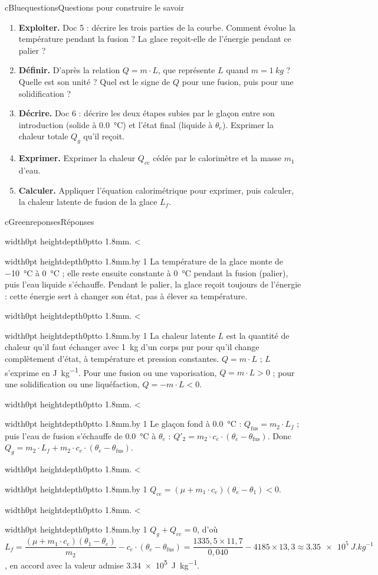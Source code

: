 \documentclass[11pt,a4paper]{article}
\newcommand{\kw}[1]{{\sffamily\bfseries\color{cBlue}#1}}   %
\newif\ifeleve
\newlength{\interligne}\setlength{\interligne}{7mm}
\newlength{\replen}
\newcommand{\pointilles}{{\color{cInk2!60}\leaders\hbox to 1.8mm{\hss.\hss}\hfill}\kern0pt}
\newcommand{\lignes}[1]{\leavevmode\vrule width0pt height\dimexpr\interligne-1mm\relax depth0pt\pointilles
  \lgn=1 \loop\ifnum\lgn<#1 \par\nointerlineskip\noindent\vrule width0pt height\interligne depth0pt\pointilles\advance\lgn by 1 \repeat}
\newcommand{\rep}[1]{%
  \ifeleve
    \sbox{\repbox}{\parbox{\linewidth}{#1}}%
    \replen=\dimexpr\ht\repbox+\dp\repbox\relax
    \repn=\numexpr\replen/\baselineskip+1\relax
    \ifnum\repn<2 \repn=2\fi
    \edef\nblignes{\the\repn}\lignes{\nblignes}%
  \else #1\fi}
\newcommand{\titrereponses}{\ifeleve Mes réponses\else Réponses\fi}
\newcommand{\tfus}{\theta_{\mathrm{fus}}}
\newcommand{\dC}[1]{\qty{#1}{\degreeCelsius}}
\begin{document}
\begin{rub}{cBlue}{questions}{Questions pour construire le savoir}
\begin{enumerate}
  \item \kw{Exploiter.} Doc 5 : décrire les trois parties de la courbe. Comment évolue la température pendant la fusion ? La glace reçoit-elle de l’énergie pendant ce palier ?
  \item \kw{Définir.} D’après la relation $Q = m\cdot L$, que représente $L$ quand $m = \qty{1}{kg}$ ? Quelle est son unité ? Quel est le signe de $Q$ pour une fusion, puis pour une solidification ?
  \item \kw{Décrire.} Doc 6 : décrire les deux étapes subies par le glaçon entre son introduction (solide à \dC{0,0}) et l’état final (liquide à $\theta_e$). Exprimer la chaleur totale $Q_g$ qu’il reçoit.
  \item \kw{Exprimer.} Exprimer la chaleur $Q_{ce}$ cédée par le calorimètre et la masse $m_1$ d’eau.
  \item \kw{Calculer.} Appliquer l’équation calorimétrique pour exprimer, puis calculer, la chaleur latente de fusion de la glace $L_f$.
\end{enumerate}
\end{rub}

\begin{rub}{cGreen}{reponses}{\titrereponses}
\begin{reps}
  \item \rep{La température de la glace monte de \dC{-10} à \dC{0} ; elle reste ensuite constante à \dC{0} pendant la fusion (palier), puis l’eau liquide s’échauffe. Pendant le palier, la glace reçoit toujours de l’énergie : cette énergie sert à changer son état, pas à élever sa température.}
  \item \rep{La chaleur latente $L$ est la quantité de chaleur qu’il faut échanger avec \qty{1}{kg} d’un corps pur pour qu’il change complètement d’état, à température et pression constantes. $Q = m\cdot L$ ; $L$ s’exprime en \unit{J.kg^{-1}}. Pour une fusion ou une vaporisation, $Q = m\cdot L > 0$ ; pour une solidification ou une liquéfaction, $Q = -m\cdot L < 0$.}
  \item \rep{Le glaçon fond à \dC{0,0} : $Q_{\mathrm{fus}} = m_2\cdot L_f$ ; puis l’eau de fusion s’échauffe de \dC{0,0} à $\theta_e$ : $Q'_2 = m_2\cdot c_e\cdot(\theta_e - \tfus)$. Donc $Q_g = m_2\cdot L_f + m_2\cdot c_e\cdot(\theta_e - \tfus)$.}
  \item \rep{$Q_{ce} = (\mu + m_1\cdot c_e)(\theta_e - \theta_1) < 0$.}
  \item \rep{$Q_g + Q_{ce} = 0$, d’où $L_f = \dfrac{(\mu + m_1\cdot c_e)(\theta_1 - \theta_e)}{m_2} - c_e\cdot(\theta_e - \tfus) = \dfrac{1335{,}5\times11{,}7}{0{,}040} - 4185\times13{,}3 \approx \qty{3,35e5}{J.kg^{-1}}$, en accord avec la valeur admise \qty{3,34e5}{J.kg^{-1}}.}
\end{reps}
\end{rub}
\end{document}
